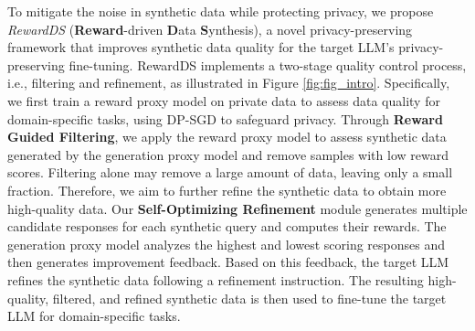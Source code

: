To mitigate the noise in synthetic data while protecting privacy, we propose \textit{RewardDS} (\textbf{Reward}-driven \textbf{D}ata \textbf{S}ynthesis), a novel privacy-preserving framework that improves synthetic data quality for the target LLM's privacy-preserving fine-tuning. 
RewardDS implements a two-stage quality control process, i.e., filtering and refinement, as illustrated in Figure \ref{fig:fig_intro}. 
Specifically, we first train a reward proxy model on private data to assess data quality for domain-specific tasks, using DP-SGD to safeguard privacy. 
Through \textbf{Reward Guided Filtering}, we apply the reward proxy model to assess synthetic data generated by the generation proxy model and remove samples with low reward scores.
Filtering alone may remove a large amount of data, leaving only a small fraction. 
Therefore, we aim to further refine the synthetic data to obtain more high-quality data.
Our \textbf{Self-Optimizing Refinement} module generates multiple candidate responses for each synthetic query and computes their rewards. 
The generation proxy model analyzes the highest and lowest scoring responses and then generates improvement feedback. 
Based on this feedback, the target LLM refines the synthetic data following a refinement instruction.
The resulting high-quality, filtered, and refined synthetic data is then used to fine-tune the target LLM for domain-specific tasks. 

